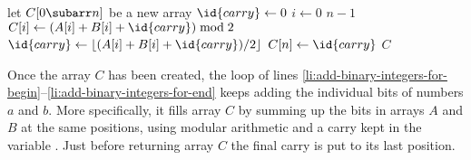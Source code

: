 \indent\begin{codebox}
\li let $C[0\subarr n]$ be a new array
\li $\id{carry}\gets0$
\li \For $i\gets0$ \To $n-1$ \label{li:add-binary-integers-for-begin}
\li     \Do $C[i]\gets(A[i]+B[i]+\id{carry})\bmod2$
\li         $\id{carry}\gets\lfloor(A[i]+B[i]+\id{carry})/2\rfloor$
        \End \label{li:add-binary-integers-for-end}
\li $C[n]\gets\id{carry}$
\li \Return $C$
\end{codebox}

Once the array $C$ has been created, the  loop of lines \ref{li:add-binary-integers-for-begin}--\ref{li:add-binary-integers-for-end} keeps adding the individual bits of numbers $a$ and $b$.
More specifically, it fills array $C$ by summing up the bits in arrays $A$ and $B$ at the same positions, using modular arithmetic and a carry kept in the variable .
Just before returning array $C$ the final carry is put to its last position.
